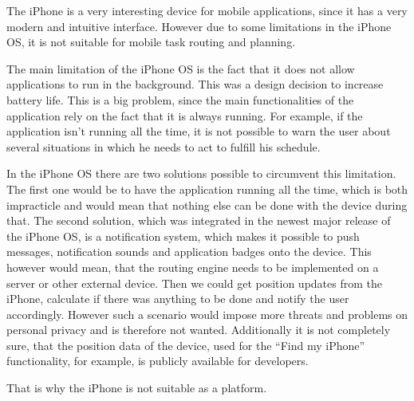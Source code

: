 The iPhone is a very interesting device for mobile applications,
since it has a very modern and intuitive interface. However due
to some limitations in the iPhone OS, it is not suitable for
mobile task routing and planning.

The main limitation of the iPhone OS is the fact that it does
not allow applications to run in the background. This was a
design decision to increase battery life. This is a big problem,
since the main functionalities of the application rely on the fact
that it is always running. For example, if the application isn't
running all the time, it is not possible to warn the user about
several situations in which he needs to act to fulfill his schedule.

In the iPhone OS there are two solutions possible to circumvent this
limitation. The first one would be to have the application running all
the time, which is both impracticle and would mean that nothing else
can be done with the device during that. The second solution, which was
integrated in the newest major release of the iPhone OS, is a
notification system, which makes it possible to push messages,
notification sounds and application badges onto the device. This
however would mean, that the routing engine needs to be implemented
on a server or other external device. Then we could get position updates
from the iPhone, calculate if there was anything to be done and
notify the user accordingly. However such a scenario would impose
more threats and problems on personal privacy and is therefore not
wanted. Additionally it is not completely sure, that the position data
of the device, used for the ``Find my iPhone'' functionality, for
example, is publicly available for developers.

That is why the iPhone is not suitable as a platform.
